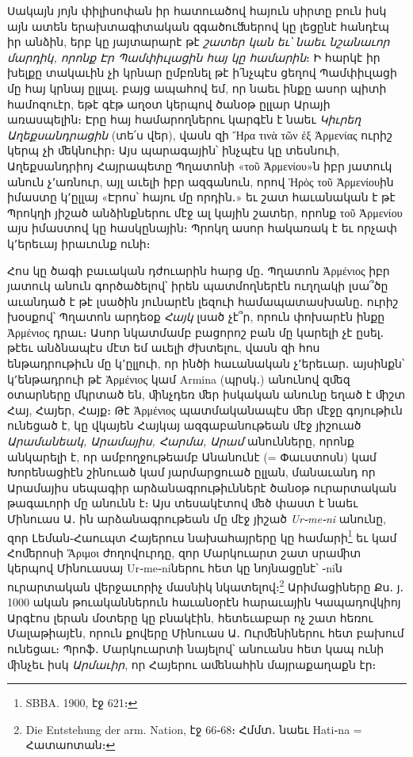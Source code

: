 \documentclass{article}
\begin{document}
{Սակայն յոյն փիլիսոփան իր հատուածով հայուն սիրտը բուն իսկ այն ատեն երախտագիտական զգածուﬓերով կը լեցընէ հանդէպ իր անձին, երբ կը յայտարարէ թէ \emph{շատեր կան եւ՝ նաեւ նշանաւոր մարդիկ, որոնք Էր Պամփիւլացին հայ կը համարին}։ Ի հարկէ իր խելքը տակաւին չի կրնար ըմբռնել թէ ի՛նչպէս ցեղով Պամփիւլացի մը հայ կրնայ ըլլալ․ բայց ապահով եմ, որ նաեւ ինքը ասոր պիտի համոզուէր, եթէ գէթ աղօտ կերպով ծանօթ ըլլար Արայի առասպելին։ Էրը հայ համարողներու կարգէն է նաեւ \emph{Կիւրեղ Աղեքսանդրացին} (տե՛ս վեր), վասն զի Ἤρα τινὰ τῶν ἐξ Ἀρμενίας ուրիշ կերպ չի ﬔկնուիր։ Այս պարագային՝ ինչպէս կը տեսնուի, Աղեքսանդրիոյ Հայրապետը Պղատոնի «τοῦ Ἀρμενίου»ն իբր յատուկ անուն չ՚առնուր, այլ աւելի իբր ազգանուն, որով Ἠρὁς τοῦ Ἀρμενίουին իմաստը կ՚ըլլայ «Էրոս՝ հայու մը որդին․» եւ շատ հաւանական է թէ Պրոկղի յիշած անձինքներու մէջ ալ կային շատեր, որոնք τοῦ Ἀρμενίου այս իմաստով կը հասկընային։ Պրոկղ ասոր հակառակ է եւ որչափ կ՚երեւայ իրաւունք ունի։

Հոս կը ծագի բաւական դժուարին հարց մը․ Պղատոն Ἀρμένιος իբր յատուկ անուն գործածելով՝ իրեն պատմողներէն ուղղակի լսա՞ծը աւանդած է թէ լսածին յունարէն լեզուի համապատասխանը․ ուրիշ խօսքով՝ Պղատոն արդեօք \emph{Հայկ} լսած չէ՞ր, որուն փոխարէն ինքը Ἀρμένιος դրաւ։ Ասոր նկատմամբ բացորոշ բան մը կարելի չէ ըսել․ թէեւ անձնապէս մէտ եմ աւելի ժխտելու, վասն զի հոս ենթադրութիւն մը կ՚ըլլուի, որ ինծի հաւանական չ՚երեւար․ այսինքն՝ կ՚ենթադրուի թէ Ἀρμένιος կամ Armina (պրսկ․) անունով զﬔզ օտարները մկրտած են, ﬕնչդեռ ﬔր իսկական անունը եղած է ﬕշտ Հայ, Հայեր, Հայք։ Թէ Ἀρμένιος պատմականապէս ﬔր մէջը գոյութիւն ունեցած է, կը վկայեն Հայկայ ազգաբանութեան մէջ յիշուած \emph{Արամանեակ, Արամայիս, Հարմա, Արամ} անունները, որոնք անկարելի է, որ ամբողջութեամբ Անանունէ (= Փաւստոսն) կամ Խորենացիէն շինուած կամ յարմարցուած ըլլան, մանաւանդ որ Արամայիս սեպագիր արձանագրութիւններէ ծանօթ ուրարտական թագաւորի մը անունն է։ Այս տեսակէտով ﬔծ փաստ է նաեւ Մինուաս Ա․ ին արձանագրութեան մը մէջ յիշած \emph{Ur֊me֊ni} անունը, զոր Լեման֊Հաուպտ Հայերուս նախահայրերը կը համարի\footnote{SBBA. 1900, էջ 621։} եւ կամ Հոﬔրոսի Ἄριμοι ժողովուրդը, զոր Մարկուարտ շատ սրաﬕտ կերպով Մինուասայ Ur֊me֊niներու հետ կը նոյնացընէ՝ ֊niն ուրարտական վերջաւորիչ մասնիկ նկատելով։\footnote{Die Entstehung der arm. Nation, էջ 66֊68։ Հմմտ․ նաեւ Hati֊na = Հատաոտան։} Արիմացիները Քս․ յ․ 1000 ական թուականներուն հաւանօրէն հարաւային Կապադովկիոյ Արգէոս լերան մօտերը կը բնակէին, հետեւաբար ոչ շատ հեռու Մալաթիայէն, որուն քովերը Մինուաս Ա․ Ուրﬔնիներու հետ բախում ունեցաւ։ Պրոֆ․ Մարկուարտի նայելով՝ անուանս հետ կապ ունի ﬕնչեւ իսկ \emph{Արմաւիր}, որ Հայերու աﬔնահին մայրաքաղաքն էր։

}
\end{document}
